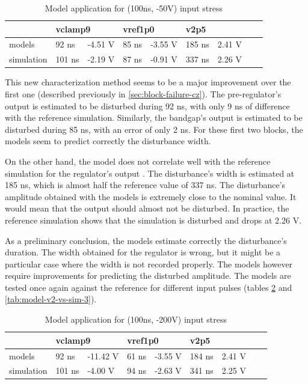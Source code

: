\begin{table}[!h]
\centering
\begin{tabular}{@{}lllllllll@{}}
           & \multicolumn{2}{l}{vclamp9}          & \multicolumn{2}{l}{vref1p0}          & \multicolumn{2}{l}{v2p5}               \\
\toprule
models     & 92 ns  & \textcolor{red!90}{-4.51 V} & 85 ns & \textcolor{red!90}{-3.55 V}  & \textcolor{red!90}{185 ns} & \textcolor{blue!90}{2.41 V} \\
simulation & 101 ns & -2.19 V                     & 87 ns & -0.91 V                      & 337 ns      & 2.26 V
\end{tabular}
\caption{Model application for (100ns, -50V) input stress}
\label{tab:model-v2-vs-sim}
\end{table}

This new characterization method seems to be a major improvement over the first one (described previously in \ref{sec:block-failure-cz}).
The pre-regulator's output is estimated to be disturbed during 92 ns, with only 9 ns of difference with the reference simulation.
Similarly, the bandgap's output is estimated to be disturbed during 85 ns, with an error of only 2 ns.
For these first two blocks, the models seem to predict correctly the disturbance width.

On the other hand, the model does not correlate well with the reference simulation for the regulator's output .
The disturbance's width is estimated at 185 ns, which is almost half the reference value of 337 ns.
The disturbance's amplitude obtained with the models is extremely close to the nominal value.
It would mean that the output should almost not be disturbed.
In practice, the reference simulation shows that the simulation is disturbed and drops at 2.26 V.

As a preliminary conclusion, the models estimate correctly the disturbance's duration.
The width obtained for the regulator is wrong, but it might be a particular case where the width is not recorded properly.
The models however require improvements for predicting the disturbed amplitude.
The models are tested once again against the reference for different input pulses (tables \ref{tab:model-v2-vs-sim-2} and \ref{tab:model-v2-vs-sim-3}).

\begin{table}[!h]
\centering
\begin{tabular}{@{}lllllllll@{}}
           & \multicolumn{2}{l}{vclamp9}           & \multicolumn{2}{l}{vref1p0} & \multicolumn{2}{l}{v2p5} \\
\toprule
models     & 92 ns  & \textcolor{red!90}{-11.42 V} & 61 ns       & -3.55 V       & \textcolor{red!90}{184 ns} & \textcolor{blue!90}{2.41 V}     \\
simulation & 101 ns & -4.00 V                      & 94 ns       & -2.63 V       & 341 ns                     & 2.25 V
\end{tabular}
\caption{Model application for (100ns, -200V) input stress}
\label{tab:model-v2-vs-sim-2}
\end{table}

